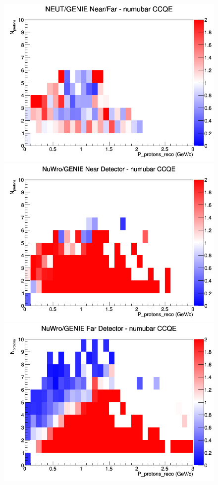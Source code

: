 \begin{figure}[h]
\endminipage
{}
\includegraphics[width=\linewidth]{eff_N_P/FGT/protons/ratios/CCQE_NEUT_GENIE_numubar_NF_N_P.png}
\endminipage
\newline
{}
\includegraphics[width=\linewidth]{eff_N_P/FGT/protons/ratios/CCQE_NuWro_GENIE_numubar_near_N_P.png}
\endminipage
{}
\includegraphics[width=\linewidth]{eff_N_P/FGT/protons/ratios/CCQE_NuWro_GENIE_numubar_far_N_P.png}

\end{figure}
